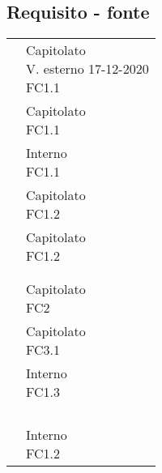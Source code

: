 {{{\subsection{Requisito - fonte}\label{RequisitiTracciamentoDeiRequisitiFonte}
\def\tabularxcolumn#1{m{#1}}
{
	\begin{center}
		\renewcommand{\arraystretch}{1.4}
		\begin{longtable}{|p{7.5cm}|p{7.5cm}|}
		\hline
		\rowcolor{airforceblue}
		\makecell[c]{\textbf{Codice RS}} & \makecell[c]{\textbf{Fonte}}  \\
		\hline
		\makecell[c]{RSFO1} & \makecell[c]{Capitolato\\V. esterno 17-12-2020 \\ FC1.1} \\
		\hline
		\makecell[c]{RSFF2} & \makecell[c]{Capitolato \\ FC1.1}\\
		\hline
		\makecell[c]{RSFO3} & \makecell[c]{Interno\\FC1.1}\\
		\hline
		\makecell[c]{RSFO4.1} & \makecell[c]{Capitolato\\FC1.2}\\
		\hline
		\makecell[c]{RSFO4.2} & \makecell[c]{Capitolato\\FC1.2}\\
		\hline
		\makecell[c]{RSFO5} & \makecell[c]{Capitolato}\\
		\hline
		\makecell[c]{RSFO5.1} & \makecell[c]{Capitolato}\\
		\hline
		\makecell[c]{RSFD6 }& \makecell[c]{Capitolato \\ FC2}\\
		\hline
		\makecell[c]{RSFO7} & \makecell[c]{Capitolato\\FC3.1}\\
		\hline
		\makecell[c]{RSFO8} & \makecell[c]{Interno \\FC1.3}\\
		\hline
		\makecell[c]{RSPO1} & \makecell[c]{Capitolato}\\
		\hline
		\makecell[c]{RSPO2} & \makecell[c]{Capitolato}\\
		\hline
		\makecell[c]{RSQO1} & \makecell[c]{Interno}\\
		\hline
		\makecell[c]{RSQF2} & \makecell[c]{Interno}\\
		\hline
		\makecell[c]{RSQF3} & \makecell[c]{Interno \\FC1.2}\\

\end{longtable}
\end{center}}}}}
